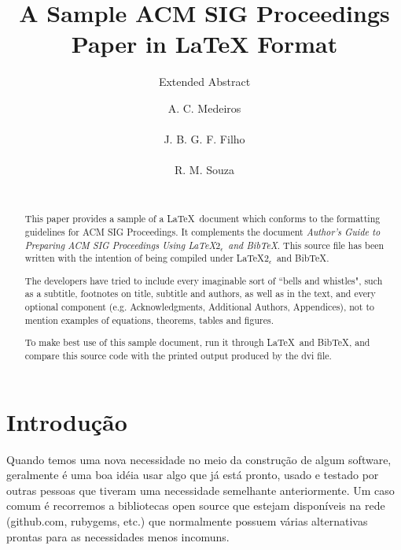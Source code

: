 \documentclass{acm_proc_article-sp}
\begin{document}
\title{A Sample {\ttlit ACM} SIG Proceedings Paper in LaTeX Format}
\subtitle{Extended Abstract}


  
\author{
\alignauthor
A. C. Medeiros\\
       \\
\alignauthor
J. B. G. F. Filho\\
       \\
\alignauthor 
R. M. Souza\\
       \\
}

\maketitle
\begin{abstract}
This paper provides a sample of a \LaTeX\ document which conforms to
the formatting guidelines for ACM SIG Proceedings.
It complements the document \textit{Author's Guide to Preparing
ACM SIG Proceedings Using \LaTeX$2_\epsilon$\ and Bib\TeX}. This
source file has been written with the intention of being
compiled under \LaTeX$2_\epsilon$\ and BibTeX.

The developers have tried to include every imaginable sort
of ``bells and whistles", such as a subtitle, footnotes on
title, subtitle and authors, as well as in the text, and
every optional component (e.g. Acknowledgments, Additional
Authors, Appendices), not to mention examples of
equations, theorems, tables and figures.

To make best use of this sample document, run it through \LaTeX\
and BibTeX, and compare this source code with the printed
output produced by the dvi file.
\end{abstract}

\section{Introdução}
Quando temos uma nova necessidade no meio da construção de algum software,
geralmente é uma boa idéia usar algo que já está pronto,
usado e testado por outras pessoas que tiveram uma necessidade semelhante anteriormente.
Um caso comum é recorremos a bibliotecas open source que estejam disponíveis na rede (github.com, rubygems, etc.)
que normalmente possuem várias alternativas prontas para as necessidades menos incomuns.
\end{document}
